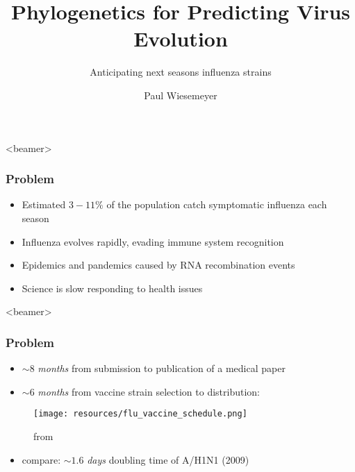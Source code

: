 \documentclass{beamer}
\title{Phylogenetics for Predicting Virus Evolution}
\subtitle{Anticipating next seasons influenza strains}
\author{Paul Wiesemeyer}
\begin{document}
  \shorthandoff{-}
  \frame{\maketitle}

  
    
  \begin{darkframes}




  \begin{frame}<beamer>
    \frametitle{Problem}


    \begin{itemize}
      \itemsep1em
      \item Estimated $3 - 11 \% $ of the population catch symptomatic influenza each season \cite{tokarsOlsen+18a}
      \item Influenza evolves rapidly, evading immune system recognition
      \item Epidemics and pandemics caused by RNA recombination events
      \item Science is slow responding to health issues
    \end{itemize}
  \end{frame}

  \begin{frame}<beamer>
    \frametitle{Problem}
    \begin{itemize}
      \item {\Large $\sim 8$ \textit{months}} from submission to publication of a medical paper \cite{aAMC18}
      \item {\Large $\sim 6$ \textit{months}} from vaccine strain selection to distribution:
    \end{itemize}
    \begin{figure}
        \texttt{[image: resources/flu\_vaccine\_schedule.png]}
        \caption{\footnotesize from \cite{bedford15}}
    \end{figure}{}
    \begin{itemize}
      \item compare: {\LARGE $\sim 1.6$ \textit{days}} doubling time of A/H1N1 (2009) \\
      \footnotesize \cite{mostaco-GuidolinGreer+11}
    \end{itemize}
    

\end{frame}
\end{darkframes}
\end{document}
